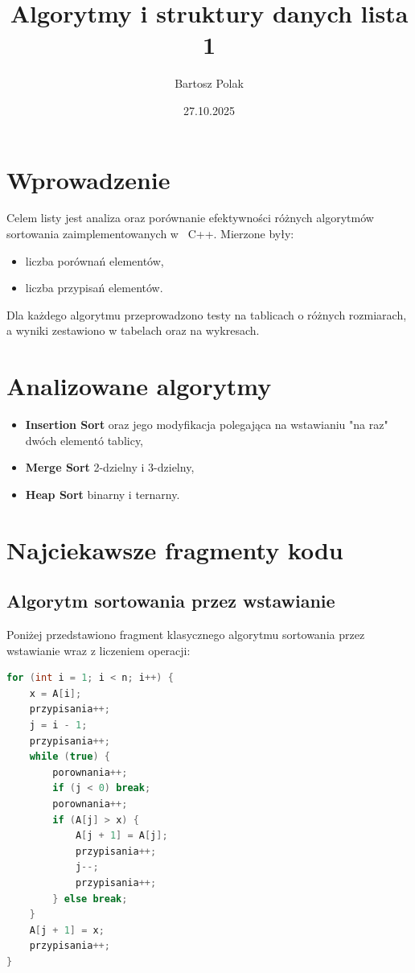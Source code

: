 \documentclass[12pt,a4paper]{article}
\title{Algorytmy i struktury danych lista 1}
\author{Bartosz Polak}
\date{27.10.2025}
\begin{document}
\maketitle

\section{Wprowadzenie}
Celem listy jest analiza oraz porównanie efektywności różnych algorytmów sortowania zaimplementowanych w ~C++. 
Mierzone były:
\begin{itemize}
  \item liczba porównań elementów,
  \item liczba przypisań elementów.
\end{itemize}
Dla każdego algorytmu przeprowadzono testy na tablicach o różnych rozmiarach, a wyniki zestawiono w tabelach oraz na wykresach.

\section{Analizowane algorytmy}
\begin{itemize}
  \item \textbf{Insertion Sort} oraz jego modyfikacja polegająca na wstawianiu "na raz" dwóch elementó tablicy,
  \item \textbf{Merge Sort} 2-dzielny i 3-dzielny,
  \item \textbf{Heap Sort} binarny i ternarny.
\end{itemize}

\section{Najciekawsze fragmenty kodu}

\subsection{Algorytm sortowania przez wstawianie}
Poniżej przedstawiono fragment klasycznego algorytmu sortowania przez wstawianie wraz z liczeniem operacji:
\begin{lstlisting}[language=C++,caption={Fragment funkcji INSERTION\_SORT}]
for (int i = 1; i < n; i++) {
    x = A[i];
    przypisania++;
    j = i - 1;
    przypisania++;
    while (true) {
        porownania++;
        if (j < 0) break;
        porownania++;
        if (A[j] > x) {
            A[j + 1] = A[j];
            przypisania++;
            j--;
            przypisania++;
        } else break;
    }
    A[j + 1] = x;
    przypisania++;
}
\end{lstlisting}
\end{document}
